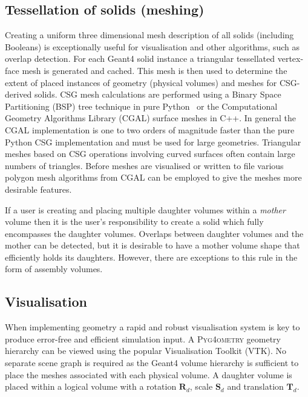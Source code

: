 \documentclass[final,5p,times,twocolumn]{elsarticle}
\newcommand{\PYGEOMETRY}{\textsc{Pyg4ometry}}
\begin{document}
\subsection{Tessellation of solids (meshing)}
Creating a uniform three dimensional mesh description of all solids (including Booleans) is exceptionally useful for visualisation and other algorithms, such as overlap 
detection. For each Geant4 solid instance a triangular tessellated vertex-face mesh is generated and cached. This mesh is then used to determine the extent 
of placed instances of geometry (physical volumes) and meshes for CSG-derived solids. CSG mesh calculations are performed using a Binary Space Partitioning 
(BSP) tree technique in pure Python~\cite{pycsg} or the Computational Geometry Algorithms Library (CGAL) surface meshes \cite{cgal:bsmf-sm-20b} in C++. In 
general the CGAL implementation is one to two orders of magnitude faster than the pure Python CSG implementation and must be used for large geometries. 
Triangular meshes based on CSG operations involving curved surfaces often contain large numbers of triangles. Before meshes are visualised or written to file 
various polygon mesh algorithms  from CGAL \cite{cgal:lty-pmp-20b} can be employed to give the meshes more desirable features. 

If a user is creating and placing multiple daughter volumes within a \emph{mother} volume then it is the user's responsibility to create a solid which fully 
encompasses the daughter volumes. Overlaps between daughter volumes and the mother can be detected, but it is desirable 
to have a mother volume shape that efficiently holds its daughters. However, there are exceptions to this rule in the form of assembly volumes. 
 
\subsection{Visualisation} \label{sec:visualisation}
When implementing geometry a rapid and robust visualisation system is key to produce error-free and efficient simulation input.
A  \PYGEOMETRY{} geometry hierarchy can be viewed using the popular Visualisation Toolkit (VTK). No separate scene graph is required as the Geant4 
volume hierarchy is sufficient to place the meshes associated with each physical volume. A daughter volume is placed within a logical volume with a rotation 
$\mathbf{R}_d$, scale $\mathbf{S}_d$ and translation $\mathbf{T}_d$.
\end{document}
